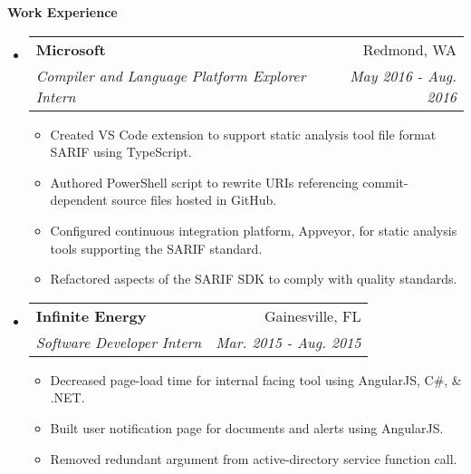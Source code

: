 \documentclass[letterpaper,10pt]{article}
\makeatletter
\newcommand{\resitem}[1]{\item #1 \vspace{-2pt}}
\newcommand{\resheading}[1]{{\large \colorbox{mygrey}{\begin{minipage}{\textwidth}{\textbf{#1 \vphantom{p\^{E}}}}\end{minipage}}}}
\newcommand{\ressubheading}[4]{
\begin{tabular*}{7.0in}{l@{\extracolsep{\fill}}r}
		\textbf{#1} & #2 \\
		\textit{#3} & \textit{#4} \\
\end{tabular*}\vspace{-6pt}}
\makeatother
\begin{document}
\resheading{Work Experience}
\begin{itemize}
\item
	\ressubheading{Microsoft}{Redmond, WA}{Compiler and Language Platform Explorer Intern}{May 2016 - Aug. 2016}
	\begin{itemize}
		\resitem{Created VS Code extension to support static analysis tool file format SARIF using TypeScript.}
	  \resitem{Authored PowerShell script to rewrite URIs referencing commit-dependent source files hosted in GitHub.}
		\resitem{Configured continuous integration platform, Appveyor, for static analysis tools supporting the SARIF standard.}
		\resitem{Refactored aspects of the SARIF SDK to comply with quality standards.}
	\end{itemize}
\item
	\ressubheading{Infinite Energy}{Gainesville, FL}{Software Developer Intern}{Mar. 2015 - Aug. 2015}
	\begin{itemize}
		\resitem{Decreased page-load time for internal facing tool using AngularJS, C\#, \& .NET.}
		\resitem{Built user notification page for documents and alerts using AngularJS.}
		\resitem{Removed redundant argument from active-directory service function call.}
	\end{itemize}
\end{itemize}
\end{document}
